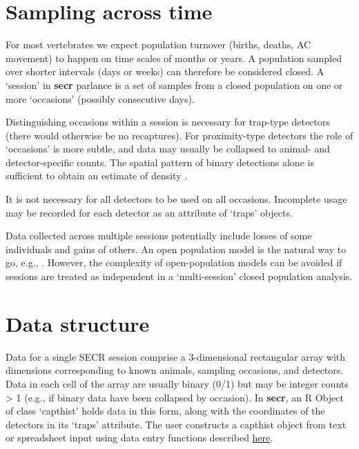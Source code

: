 \documentclass[
]{book}
\begin{document}
\section{Sampling across time}\label{sampling-across-time}

For most vertebrates we expect population turnover (births, deaths, AC movement) to happen on time scales of months or years. A population sampled over shorter intervals (days or weeks) can therefore be considered closed. A `session' in \textbf{secr} parlance is a set of samples from a closed population on one or more `occasions' (possibly consecutive days).

Distinguishing occasions within a session is necessary for trap-type detectors (there would otherwise be no recaptures). For proximity-type detectors the role of `occasions' is more subtle, and data may usually be collapsed to animal- and detector-specific counts. The spatial pattern of binary detections alone is sufficient to obtain an estimate of density \citep{edb09}.

It is not necessary for all detectors to be used on all occasions. Incomplete usage \citep[and other variation in effort per occasion --][]{ebm13} may be recorded for each detector as an attribute of `traps' objects.

Data collected across multiple sessions potentially include losses of some individuals and gains of others. An open population model is the natural way to go, e.g., \citet{es20}. However, the complexity of open-population models can be avoided if sessions are treated as independent in a `multi-session' closed population analysis.

\section{Data structure}\label{data-structure}

Data for a single SECR session comprise a 3-dimensional rectangular array with dimensions corresponding to known animals, sampling occasions, and detectors. Data in each cell of the array are usually binary (0/1) but may be integer counts \textgreater{} 1 (e.g., if binary data have been collapsed by occasion). In \textbf{secr}, an R Object of class `capthist' holds data in this form, along with the coordinates of the detectors in its `traps' attribute. The user constructs a capthist object from text or spreadsheet input using data entry functions described \href{https://cran.r-project.org/web/packages/secr/vignettes/secr-datainput.pdf}{here}.
\end{document}
